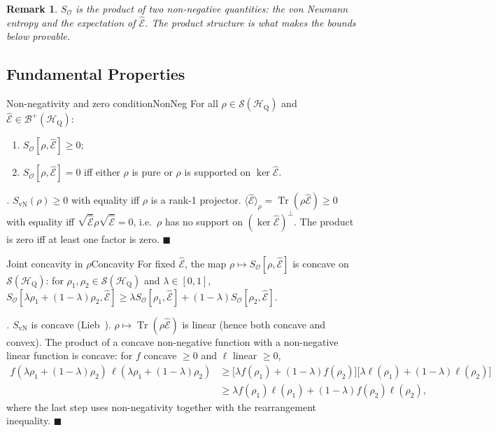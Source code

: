 \documentclass[11pt,a4paper]{article}
\theoremstyle{myrmk}
\newtheorem{remark}{Remark}[section]
\renewenvironment{proof}[1][\proofname]{%
  \par\noindent\textit{#1.}\enspace\ignorespaces}{\hfill$\blacksquare$\par\medskip}
\newcommand{\HH}{\mathcal{H}_{\mathrm{Q}}}
\newcommand{\Tr}{\operatorname{Tr}}
\newcommand{\Ehat}{\hat{\mathcal{E}}}
\begin{document}
\begin{remark}
$S_{\mathcal{O}}$ is the \emph{product} of two non-negative quantities: the von Neumann
entropy and the expectation of $\Ehat$. The product structure is what makes the bounds
below provable.
\end{remark}

\subsection{Fundamental Properties}

\begin{theorem}{Non-negativity and zero condition}{NonNeg}
For all $\rho\in\mathcal{S}(\HH)$ and $\Ehat\in\mathcal{B}^+(\HH)$:
\begin{enumerate}[label=\textup{(\roman*)}]
  \item $S_{\mathcal{O}}[\rho,\Ehat]\geq 0$;
  \item $S_{\mathcal{O}}[\rho,\Ehat]=0$ iff either $\rho$ is pure or $\rho$ is supported
    on $\ker\Ehat$.
\end{enumerate}
\end{theorem}

\begin{proof}
$S_{\mathrm{vN}}(\rho)\geq 0$ with equality iff $\rho$ is a rank-1 projector.
$\langle\Ehat\rangle_\rho=\Tr(\rho\Ehat)\geq 0$ with equality iff
$\sqrt{\Ehat}\rho\sqrt{\Ehat}=0$, i.e.\ $\rho$ has no support on $(\ker\Ehat)^\perp$.
The product is zero iff at least one factor is zero.
\end{proof}

\begin{theorem}{Joint concavity in $\rho$}{Concavity}
For fixed $\Ehat$, the map $\rho\mapsto S_{\mathcal{O}}[\rho,\Ehat]$ is concave on
$\mathcal{S}(\HH)$: for $\rho_1,\rho_2\in\mathcal{S}(\HH)$ and $\lambda\in[0,1]$,
$S_{\mathcal{O}}[\lambda\rho_1+(1-\lambda)\rho_2,\Ehat]
\geq \lambda S_{\mathcal{O}}[\rho_1,\Ehat]+(1-\lambda)S_{\mathcal{O}}[\rho_2,\Ehat]$.
\end{theorem}

\begin{proof}
$S_{\mathrm{vN}}$ is concave (Lieb~\cite{Lieb1973}). $\rho\mapsto\Tr(\rho\Ehat)$ is
linear (hence both concave and convex). The product of a concave non-negative function
with a non-negative linear function is concave: for $f$ concave $\geq 0$ and $\ell$
linear $\geq 0$,
\begin{align*}
  f(\lambda\rho_1+(1-\lambda)\rho_2)\,\ell(\lambda\rho_1+(1-\lambda)\rho_2)
  &\geq\bigl[\lambda f(\rho_1)+(1-\lambda)f(\rho_2)\bigr]
   \bigl[\lambda\ell(\rho_1)+(1-\lambda)\ell(\rho_2)\bigr]\\
  &\geq \lambda f(\rho_1)\ell(\rho_1)+(1-\lambda)f(\rho_2)\ell(\rho_2),
\end{align*}
where the last step uses non-negativity together with the rearrangement inequality.
\end{proof}
\end{document}
